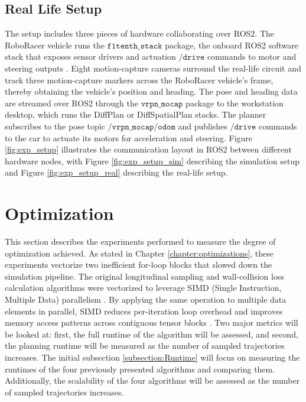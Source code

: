 \subsection{Real Life Setup}

The setup includes three pieces of hardware collaborating over ROS2.
The RoboRacer vehicle runs the $\texttt{f1tenth\_stack}$ package, the onboard ROS2 software stack that exposes sensor drivers and actuation $\texttt{/drive}$ commands to motor and steering outputs \cite{okelly_F1TENTHOpensourceEvaluation_2019, betz_TUMAutonomousMotorsport_2023}.
Eight motion-capture cameras surround the real-life circuit and track three motion-capture markers across the RoboRacer vehicle's frame, thereby obtaining the vehicle's position and heading.
The pose and heading data are streamed over ROS2 through the $\texttt{vrpn\_mocap}$ package to the workstation desktop, which runs the DiffPlan or DiffSpatialPlan stacks.
The planner subscribes to the pose topic $\texttt{/vrpn\_mocap/odom}$ and publishes $\texttt{/drive}$ commands to the car to actuate its motors for acceleration and steering.
Figure \ref{fig:exp_setup} illustrates the communication layout in ROS2 between different hardware nodes, with Figure \ref{fig:exp_setup_sim} describing the simulation setup and Figure \ref{fig:exp_setup_real} describing the real-life setup.


\section{Optimization}
\label{section:Optimization}

This section describes the experiments performed to measure the degree of optimization achieved.
As stated in Chapter \ref{chapter:optimizations}, these experiments vectorize two inefficient for-loop blocks that slowed down the simulation pipeline.
The original longitudinal sampling and wall-collision loss calculation algorithms were vectorized to leverage SIMD (Single Instruction, Multiple Data) parallelism \cite{flynn_ComputerOrganizationsTheir_1972}.
By applying the same operation to multiple data elements in parallel, SIMD reduces per-iteration loop overhead and improves memory access patterns across contiguous tensor blocks \cite{paszke_PyTorchImperativeStyle_2019}.
Two major metrics will be looked at: first, the full runtime of the algorithm will be assessed, and second, the planning runtime will be measured as the number of sampled trajectories increases.
The initial subsection \ref{subsection:Runtime} will focus on measuring the runtimes of the four previously presented algorithms and comparing them.
Additionally, the scalability of the four algorithms will be assessed as the number of sampled trajectories increases.

